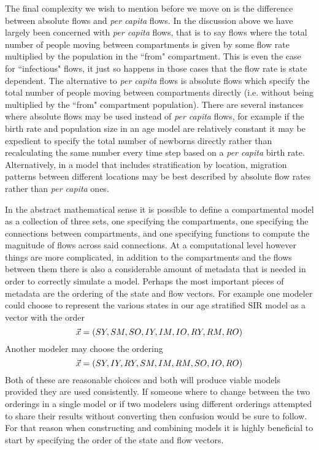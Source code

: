 The final complexity we wish to mention before we move on is the difference between absolute flows and \emph{per capita} flows. In the discussion above we have largely been concerned with \emph{per capita} flows, that is to say flows where the total number of people moving between compartments is given by some flow rate multiplied by the population in the ``from" compartment. This is even the case for ``infectious" flows, it just so happens in those cases that the flow rate is state dependent. The alternative to \emph{per capita} flows is absolute flows which specify the total number of people moving between compartments directly (i.e. without being multiplied by the ``from" compartment population). There are several instances where absolute flows may be used instead of \emph{per capita} flows, for example if the birth rate and population size in an age model are relatively constant it may be expedient to specify the total number of newborns directly rather than recalculating the same number every time step based on a \emph{per capita} birth rate. Alternatively, in a model that includes stratification by location, migration patterns between different locations may be best described by absolute flow rates rather than \emph{per capita} ones.

In the abstract mathematical sense it is possible to define a compartmental model as a collection of three sets, one specifying the compartments, one specifying the connections between compartments, and one specifying functions to compute the magnitude of flows across said connections. At a computational level however things are more complicated, in addition to the compartments and the flows between them there is also a considerable amount of metadata that is needed in order to correctly simulate a model. Perhaps the most important pieces of metadata are the ordering of the state and flow vectors. For example one modeler could choose to represent the various states in our age stratified SIR model as a vector with the order 
\[
    \vec{x} = (SY, SM, SO, IY, IM, IO, RY, RM, RO)
\]
Another modeler may choose the ordering
\[
    \vec{x} = (SY, IY, RY, SM, IM, RM, SO, IO, RO)
\]
Both of these are reasonable choices and both will produce viable models provided they are used consistently. If someone where to change between the two orderings in a single model or if two modelers using different orderings attempted to share their results without converting then confusion would be sure to follow. For that reason when constructing and combining models it is highly beneficial to start by specifying the order of the state and flow vectors.


